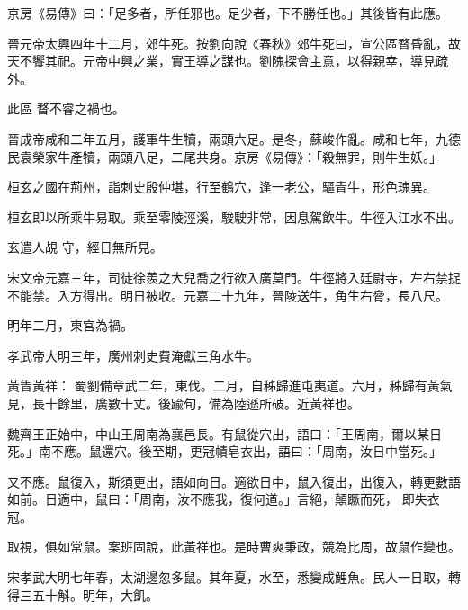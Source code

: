 \begin{pinyinscope}
 京房《易傳》曰：「足多者，所任邪也。足少者，下不勝任也。」其後皆有此應。



 晉元帝太興四年十二月，郊牛死。按劉向說《春秋》郊牛死曰，宣公區瞀昏亂，故天不饗其祀。元帝中興之業，實王導之謀也。劉隗探會主意，以得親幸，導見疏外。



 此區
 瞀不睿之禍也。



 晉成帝咸和二年五月，護軍牛生犢，兩頭六足。是冬，蘇峻作亂。咸和七年，九德民袁榮家牛產犢，兩頭八足，二尾共身。京房《易傳》：「殺無罪，則牛生妖。」



 桓玄之國在荊州，詣刺史殷仲堪，行至鶴穴，逢一老公，驅青牛，形色瑰異。



 桓玄即以所乘牛易取。乘至零陵涇溪，駿駛非常，因息駕飲牛。牛徑入江水不出。



 玄遣人覘
 守，經日無所見。



 宋文帝元嘉三年，司徒徐羨之大兒喬之行欲入廣莫門。牛徑將入廷尉寺，左右禁捉不能禁。入方得出。明日被收。元嘉二十九年，晉陵送牛，角生右脅，長八尺。



 明年二月，東宮為禍。



 孝武帝大明三年，廣州刺史費淹獻三角水牛。



 黃眚黃祥：
 蜀劉備章武二年，東伐。二月，自秭歸進屯夷道。六月，秭歸有黃氣見，長十餘里，廣數十丈。後踰旬，備為陸遜所破。近黃祥也。



 魏齊王正始中，中山王周南為襄邑長。有鼠從穴出，語曰：「王周南，爾以某日死。」南不應。鼠還穴。後至期，更冠幘皂衣出，語曰：「周南，汝日中當死。」



 又不應。鼠復入，斯須更出，語如向日。適欲日中，鼠入復出，出復入，轉更數語如前。日適中，鼠曰：「周南，汝不應我，復何道。」言絕，顛蹶而死，
 即失衣冠。



 取視，俱如常鼠。案班固說，此黃祥也。是時曹爽秉政，競為比周，故鼠作變也。



 宋孝武大明七年春，太湖邊忽多鼠。其年夏，水至，悉變成鯉魚。民人一日取，轉得三五十斛。明年，大飢。




\end{pinyinscope}

